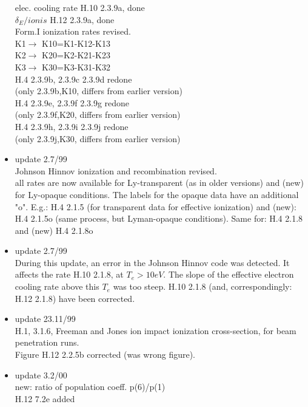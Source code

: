 \documentclass[12pt,dvipdfmx]{article}
\begin{document}
\begin{itemize}
               elec. cooling rate  H.10 2.3.9a, done \\
              $\delta_E/ionis$     H.12 2.3.9a, done \\
  Form.I ionization rates revised. \\
   K1$\rightarrow$ K10=K1-K12-K13 \\
   K2$\rightarrow$ K20=K2-K21-K23 \\
   K3$\rightarrow$ K30=K3-K31-K32 \\
               H.4 2.3.9b, 2.3.9c 2.3.9d  redone \\
               (only 2.3.9b,K10, differs from earlier version)\\
               H.4 2.3.9e, 2.3.9f 2.3.9g  redone \\
               (only 2.3.9f,K20, differs from earlier version)\\
               H.4 2.3.9h, 2.3.9i 2.3.9j  redone \\
               (only 2.3.9j,K30, differs from earlier version)\\
 \item update   2.7/99 \\
  Johnson Hinnov ionization and recombination revised.\\
  all rates are now available for Ly-transparent (as in older versions)
  and (new) for Ly-opaque conditions. The labels for the opaque
  data have an additional "o". E.g.: H.4 2.1.5 (for transparent
  data for effective ionization) and (new): H.4 2.1.5o (same process,
  but Lyman-opaque conditions). Same for: H.4 2.1.8 and (new) H.4 2.1.8o
 \item update   2.7/99 \\
  During this update, an error in the Johnson Hinnov code was detected.
  It affects the rate H.10 2.1.8, at $T_e > 10 eV$. The slope of the
  effective electron cooling rate above this $T_e$ was too steep.
  H.10 2.1.8  (and, correspondingly: H.12 2.1.8) have been corrected.
 \item update   23.11/99 \\
  H.1, 3.1.6, Freeman and Jones ion impact ionization cross-section,
  for beam penetration runs.\\
  Figure H.12 2.2.5b corrected (was wrong figure).
 \item update   3.2/00 \\
  new: ratio of population coeff. p(6)/p(1)\\
  H.12 7.2e added                            \\

\end{itemize}
\end{document}
